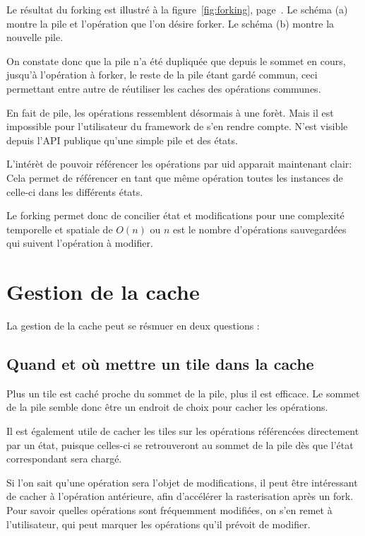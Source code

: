 			Le résultat du forking est illustré à la figure~\ref{fig:forking}, page~\pageref{fig:forking}. Le schéma (a) montre la pile et l'opération
			que l'on désire forker. Le schéma (b) montre la nouvelle pile. 
			
			On constate donc que la pile n'a été dupliquée que depuis le sommet en cours, jusqu'à l'opération à forker, le reste de la pile 
			étant gardé commun, ceci permettant entre autre de réutiliser les caches des opérations communes. 

			En fait de pile, les opérations ressemblent désormais à une forèt. Mais il est impossible pour l'utilisateur du framework de s'en
			rendre compte. N'est visible depuis l'API publique qu'une simple pile et des états.

			L'intérèt de pouvoir référencer les opérations par uid apparait maintenant clair: Cela permet de référencer en tant que même 
			opération toutes les instances de celle-ci dans les différents états.  

			Le forking permet donc de concilier état et modifications pour une complexité temporelle et spatiale de $O(n)$ ou $n$ est le nombre
			d'opérations sauvegardées qui suivent l'opération à modifier.

			
		
	\section{Gestion de la cache}
		La gestion de la cache peut se résmuer en deux questions :
		\subsection{Quand et où mettre un tile dans la cache}
			Plus un tile est caché proche du sommet de la pile, plus il est efficace. Le sommet de la pile semble donc
			être un endroit de choix pour cacher les opérations. 

			Il est également utile de cacher les tiles sur les opérations référencées directement par un état, puisque
			celles-ci se retrouveront au sommet de la pile dès que l'état correspondant sera chargé. 

			Si l'on sait qu'une opération sera l'objet de modifications, il peut être intéressant de cacher à l'opération
			antérieure, afin d'accélérer la rasterisation après un fork. Pour savoir quelles opérations sont fréquemment
			modifiées, on s'en remet à l'utilisateur, qui peut marquer les opérations qu'il prévoit de modifier. 

